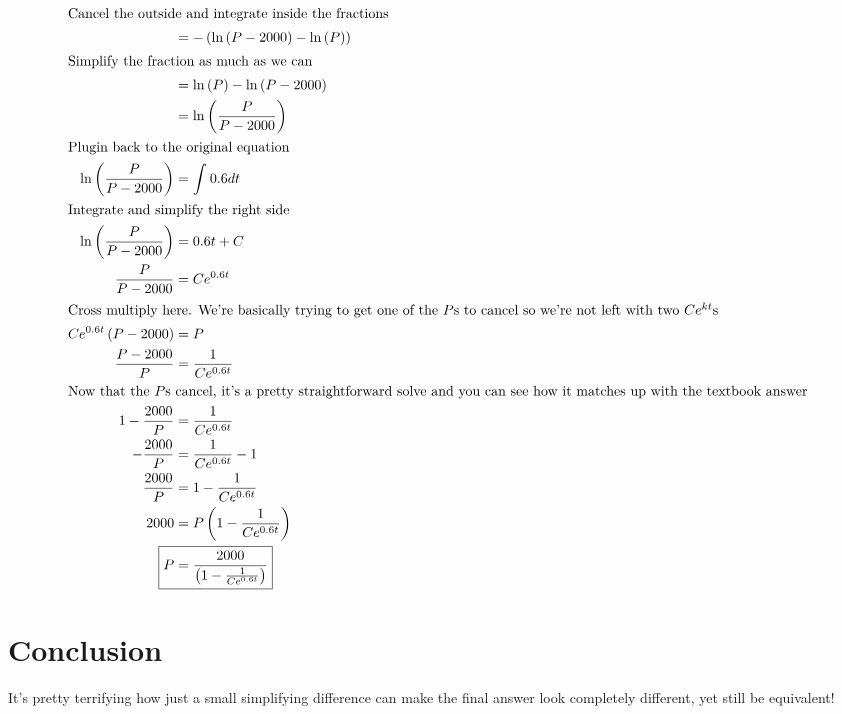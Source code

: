 \documentclass[12pt]{article}
\begin{document}
\begin{align}
  \intertext{Cancel the outside and integrate inside the fractions}
                                   & =-\left(\ln\left(P-2000\right)-\ln\left(P\right)\right)                                                     \\
  \intertext{Simplify the fraction as much as we can}
                                   & =\ln\left(P\right)-\ln\left(P-2000\right)                                                                   \\
                                   & =\ln\left(\frac{P}{P-2000}\right)                                                                           \\
  \intertext{Plugin back to the original equation}
  \ln\left(\frac{P}{P-2000}\right) & =\int_{ }^{ }0.6dt                                                                                          \\
  \intertext{Integrate and simplify the right side}
  \ln\left(\frac{P}{P-2000}\right) & =0.6t+C                                                                                                     \\
  \frac{P}{P-2000}                 & =Ce^{0.6t}                                                                                                  \\
  \intertext{Cross multiply here. We're basically trying to get one of the $P$s to cancel so we're not left with two $Ce^{kt}$s}
  Ce^{0.6t}\left(P-2000\right)     & =P                                                                                                          \\
  \frac{P-2000}{P}                 & =\frac{1}{Ce^{0.6t}}                                                                                        \\
  \intertext{Now that the $P$s cancel, it's a pretty straightforward solve and you can see how it matches up with the textbook answer}
  1-\frac{2000}{P}                 & =\frac{1}{Ce^{0.6t}}                                                                                        \\
  -\frac{2000}{P}                  & =\frac{1}{Ce^{0.6t}}-1                                                                                      \\
  \frac{2000}{P}                   & =1-\frac{1}{Ce^{0.6t}}                                                                                      \\
  2000                             & =P\left(1-\frac{1}{Ce^{0.6t}}\right)                                                                        \\
  \Aboxed{P                                & =\frac{2000}{\left(1-\frac{1}{Ce^{0.6t}}\right)}}                                                            \\
\end{align}
\section{Conclusion}
It's pretty terrifying how just a small simplifying difference can make the final answer look completely different, yet still be equivalent!
\end{document}
